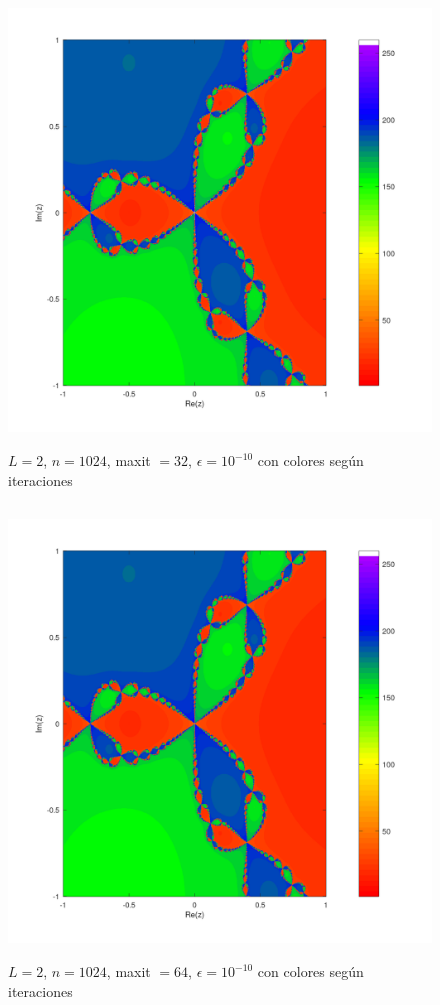 \documentclass{article} %
\begin{document}
\begin{figure}[H]
    \centering
    \includegraphics[width=152mm, height=120mm]{images/L2n1024maxit32e10-10colordegradado.png}
    \caption{$L=2$, $n=1024$, maxit $=32$, $\epsilon=10^{-10}$ con colores según iteraciones}
\end{figure}

\begin{figure}[H]
    \centering
    \includegraphics[width=152mm, height=120mm]{images/L2n1024maxit64e10-10colordegradado.png}
    \caption{$L=2$, $n=1024$, maxit $=64$, $\epsilon=10^{-10}$ con colores según iteraciones}
\end{figure}
\end{document}
